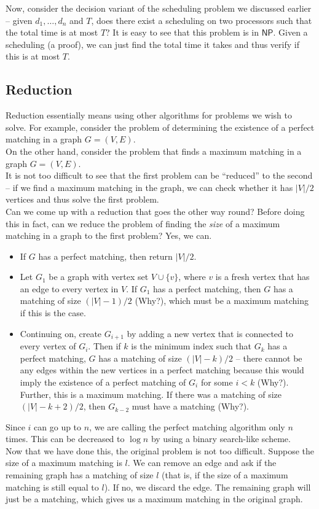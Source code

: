 Now, consider the decision variant of the scheduling problem we discussed earlier -- given $d_1,\ldots,d_n$ and $T$, does there exist a scheduling on two processors such that the total time is at most $T$? It is easy to see that this problem is in $\mathsf{NP}$. Given a scheduling (a proof), we can just find the total time it takes and thus verify if this is at most $T$.

\subsection{Reduction}

Reduction essentially means using other algorithms for problems we wish to solve. For example, consider the problem of determining the existence of a perfect matching in a graph $G=(V,E)$.\\
On the other hand, consider the problem that finds a maximum matching in a graph $G=(V,E)$.\\
It is not too difficult to see that the first problem can be ``reduced'' to the second -- if we find a maximum matching in the graph, we can check whether it has $|V|/2$ vertices and thus solve the first problem.\\
Can we come up with a reduction that goes the other way round? Before doing this in fact, can we reduce the problem of finding the \textit{size} of a maximum matching in a graph to the first problem? Yes, we can.
\begin{itemize}
	\item If $G$ has a perfect matching, then return $|V|/2$.
	\item Let $G_1$ be a graph with vertex set $V\cup\{v\}$, where $v$ is a fresh vertex that has an edge to every vertex in $V$. If $G_1$ has a perfect matching, then $G$ has a matching of size $(|V|-1)/2$ (Why?), which must be a maximum matching if this is the case.
	\item Continuing on, create $G_{i+1}$ by adding a new vertex that is connected to every vertex of $G_{i}$. Then if $k$ is the minimum index such that $G_k$ has a perfect matching, $G$ has a matching of size $(|V|-k)/2$ -- there cannot be any edges within the new vertices in a perfect matching because this would imply the existence of a perfect matching of $G_i$ for some $i<k$ (Why?). Further, this is a maximum matching. If there was a matching of size $(|V|-k+2)/2$, then $G_{k-2}$ must have a matching (Why?).
\end{itemize}
Since $i$ can go up to $n$, we are calling the perfect matching algorithm only $n$ times. This can be decreased to $\log n$ by using a binary search-like scheme.\\
Now that we have done this, the original problem is not too difficult. Suppose the size of a maximum matching is $l$. We can remove an edge and ask if the remaining graph has a matching of size $l$ (that is, if the size of a maximum matching is still equal to $l$). If no, we discard the edge. The remaining graph will just be a matching, which gives us a maximum matching in the original graph.

